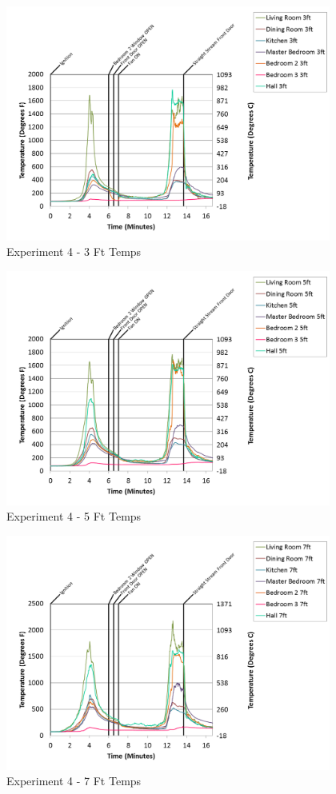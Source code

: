 \documentclass{article}
\begin{document}
\begin{appendices}
\begin{figure}[h!]
	\centering
	\includegraphics[height=3.05in]{0_Images/Results_Charts/Exp_4_Charts/3FtTemps.png}
	\caption{Experiment 4 - 3 Ft Temps}
\end{figure}

\clearpage

\begin{figure}[h!]
	\centering
	\includegraphics[height=3.05in]{0_Images/Results_Charts/Exp_4_Charts/5FtTemps.png}
	\caption{Experiment 4 - 5 Ft Temps}
\end{figure}


\begin{figure}[h!]
	\centering
	\includegraphics[height=3.05in]{0_Images/Results_Charts/Exp_4_Charts/7FtTemps.png}
	\caption{Experiment 4 - 7 Ft Temps}
\end{figure}


\end{appendices}
\end{document}
